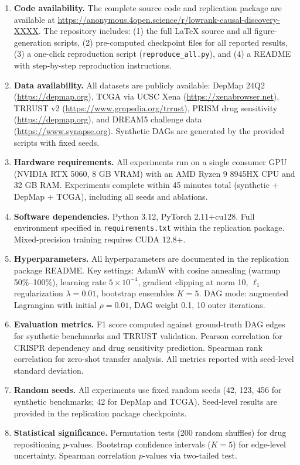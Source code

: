 \documentclass{article}
\theoremstyle{definition}
\begin{document}
\begin{enumerate}
\item \textbf{Code availability.} The complete source code and replication package are available at \url{https://anonymous.4open.science/r/lowrank-causal-discovery-XXXX}. The repository includes: (1) the full LaTeX source and all figure-generation scripts, (2) pre-computed checkpoint files for all reported results, (3) a one-click reproduction script (\texttt{reproduce\_all.py}), and (4) a README with step-by-step reproduction instructions.

\item \textbf{Data availability.} All datasets are publicly available: DepMap 24Q2 (\url{https://depmap.org}), TCGA via UCSC Xena (\url{https://xenabrowser.net}), TRRUST v2 (\url{https://www.grnpedia.org/trrust}), PRISM drug sensitivity (\url{https://depmap.org}), and DREAM5 challenge data (\url{https://www.synapse.org}). Synthetic DAGs are generated by the provided scripts with fixed seeds.

\item \textbf{Hardware requirements.} All experiments run on a single consumer GPU (NVIDIA RTX 5060, 8 GB VRAM) with an AMD Ryzen 9 8945HX CPU and 32 GB RAM. Experiments complete within 45 minutes total (synthetic + DepMap + TCGA), including all seeds and ablations.

\item \textbf{Software dependencies.} Python 3.12, PyTorch 2.11+cu128. Full environment specified in \texttt{requirements.txt} within the replication package. Mixed-precision training requires CUDA 12.8+.

\item \textbf{Hyperparameters.} All hyperparameters are documented in the replication package README. Key settings: AdamW with cosine annealing (warmup 50\%--100\%), learning rate $5 \times 10^{-4}$, gradient clipping at norm 10, $\ell_1$ regularization $\lambda = 0.01$, bootstrap ensembles $K = 5$. DAG mode: augmented Lagrangian with initial $\rho = 0.01$, DAG weight 0.1, 10 outer iterations.

\item \textbf{Evaluation metrics.} F1 score computed against ground-truth DAG edges for synthetic benchmarks and TRRUST validation. Pearson correlation for CRISPR dependency and drug sensitivity prediction. Spearman rank correlation for zero-shot transfer analysis. All metrics reported with seed-level standard deviation.

\item \textbf{Random seeds.} All experiments use fixed random seeds (42, 123, 456 for synthetic benchmarks; 42 for DepMap and TCGA). Seed-level results are provided in the replication package checkpoints.

\item \textbf{Statistical significance.} Permutation tests (200 random shuffles) for drug repositioning $p$-values. Bootstrap confidence intervals ($K = 5$) for edge-level uncertainty. Spearman correlation $p$-values via two-tailed test.
\end{enumerate}
\end{document}
